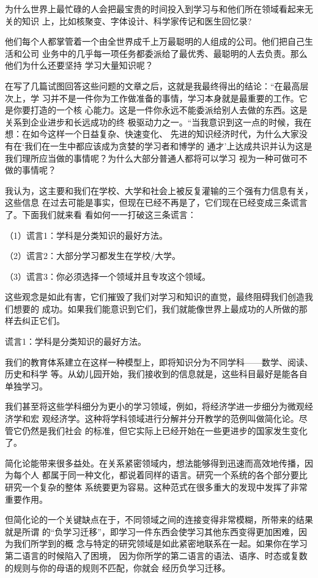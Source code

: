 \documentclass[11pt]{ctexart}
\begin{document}
{{{{为什么世界上最忙碌的人会把最宝贵的时间投入到学习与和他们所在领域看起来无关的知识
上，比如核聚变、字体设计、科学家传记和医生回忆录?

他们每个人都掌管着一个由全世界成千上万最聪明的人组成的公司。他们把自己生活和公司
业务中的几乎每一项任务都委派给了最优秀、最聪明的人去负责。那么他们为什么还要坚持
学习大量知识呢？

在写了几篇试图回答这些问题的文章之后，这就是我最终得出的结论：“在最高层次上，学
习并不是一件你为工作做准备的事情，学习本身就是最重要的工作。它是你要打造的一个核
心能力。这是一件你永远不能委派给别人去做的东西。这是关系到企业进步和长远成功的终
极驱动力之一。“当我意识到这一点的时候，我在想：在如今这样一个日益复杂、快速变化、
先进的知识经济时代，为什么大家没有在‘我们在一生中都应该成为贪婪的学习者和博学的
通才’上达成共识并认为这是我们理所应当做的事情呢？为什么大部分普通人都将可以学习
视为一种可做可不做的事情呢？

我认为，这主要和我们在学校、大学和社会上被反复灌输的三个强有力信息有关，这些信息
在过去可能是事实，但现在已经不再是了，它们现在已经变成三条谎言了。下面我们就来看
看如何一一打破这三条谎言：

（1）谎言1：学科是分类知识的最好方法。

（2）谎言2：大部分学习都发生在学校/大学。

（3）谎言3：你必须选择一个领域并且专攻这个领域。

这些观念是如此有害，它们摧毁了我们对学习和知识的直觉，最终阻碍我们创造我们想要的
成功。如果我们能意识到它们，我们就能像世界上最成功的人所做的那样去纠正它们。

谎言1：学科是分类知识的最好方法。

我们的教育体系建立在这样一种模型上，即将知识分为不同学科——数学、阅读、历史和科学
等。从幼儿园开始，我们接收到的信息就是，这些科目最好是能各自单独学习。

我们甚至将这些学科细分为更小的学习领域，例如，将经济学进一步细分为微观经济学和宏
观经济学。这种将学科领域进行分解并分开教学的范例叫做简化论。尽管它仍然是我们社会
的标准，但它实际上已经开始在一些更进步的国家发生变化了。

简化论能带来很多益处。在关系紧密领域内，想法能够得到迅速而高效地传播，因为每个人
都属于同一种文化，都说着同样的语言。研究一个系统的各个部分要比研究一个复杂的整体
系统要更为容易。这种范式在很多重大的发现中发挥了非常重要作用。

但简化论的一个关键缺点在于，不同领域之间的连接变得非常模糊，所带来的结果就是所谓
的“负学习迁移”，即学习一件东西会使学习其他东西变得更加困难，因为我们所学到的概
念与特定的研究领域是如此紧密地联系在一起。如果你在学习第二语言的时候陷入了困境，
因为你所学的第二语言的语法、语序、时态或复数的规则与你的母语的规则不匹配，你就会
经历负学习迁移。

}}}}
\end{document}
